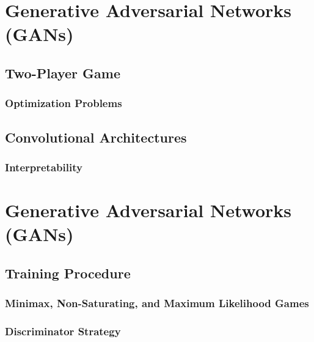 	\section{Generative Adversarial Networks (GANs)} %

		\subsection{Two-Player Game} %

			\subsubsection{Optimization Problems} %

		\subsection{Convolutional Architectures} %

			\subsubsection{Interpretability} %

	\section{Generative Adversarial Networks (GANs)} %

		\subsection{Training Procedure} %

			\subsubsection{Minimax, Non-Saturating, and Maximum Likelihood Games} %

			\subsubsection{Discriminator Strategy} %


